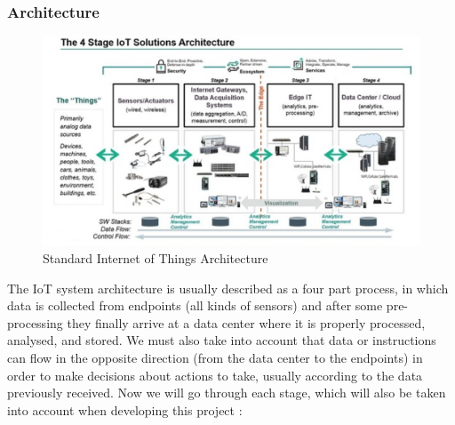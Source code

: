\documentclass[12pt]{article}
\begin{document}
\subsubsection{Architecture}

\begin{figure}[h]
\includegraphics[scale=0.27]{iot-arch}
\centering
\caption{Standard Internet of Things Architecture \protect\cite{stokes}}
\label{fig:iot-arch}
\end{figure}

The IoT system architecture is usually described as a four part process, in which data is collected from endpoints (all kinds of sensors) and after some pre-processing they finally arrive at a data center where it is properly processed, analysed, and stored. We must also take into account that data or instructions can flow in the opposite direction (from the data center to the endpoints) in order to make decisions about actions to take, usually according to the data previously received. Now we will go through each stage, which will also be taken into account when developing this project \cite{digi}\cite{marlabs}:
\end{document}
